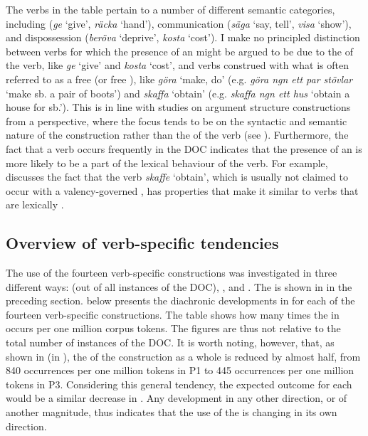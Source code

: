 \documentclass[output=paper]{langscibook}
\begin{document}
The verbs in the table pertain to a number of different semantic categories, including  (\textit{ge} ‘give’, \textit{räcka} ‘hand’), communication (\textit{säga} ‘say, tell’, \textit{visa} ‘show’), and dispossession (\textit{beröva} ‘deprive’, \textit{kosta} ‘cost’). I make no principled distinction between verbs for which the presence of an  might be argued to be due to the  of the verb, like \textit{ge} ‘give’ and \textit{kosta} ‘cost’, and verbs construed with what is often referred to as a free  (or free ), like \textit{göra} ‘make, do’ (e.g. \textit{göra ngn ett par stövlar} ‘make sb. a pair of boots’) and \textit{skaffa} ‘obtain’ (e.g. \textit{skaffa ngn ett hus} ‘obtain a house for sb.’). This is in line with studies on argument structure constructions from a  perspective, where the focus tends to be on the syntactic and semantic nature of the construction rather than the  of the verb (see \citealt{Goldberg1995}). Furthermore, the fact that a verb occurs frequently in the DOC indicates that the presence of an  is more likely to be a part of the lexical behaviour of the verb. For example, \citet[150--151]{Nielsen2019} discusses the fact that the  verb \textit{skaffe} ‘obtain’, which is usually not claimed to occur with a valency-governed , has properties that make it similar to verbs that are lexically .


\subsection{Overview of verb-specific tendencies}\label{sec:valdeson:5.2}


The use of the fourteen verb-specific constructions was investigated in three different ways:  (out of all instances of the DOC), , and . The  is shown in  in the preceding section.  below presents the diachronic developments in  for each of the fourteen verb-specific constructions. The table shows how many times the  in  occurs per one million corpus tokens. The figures are thus not relative to the total number of instances of the DOC. It is worth noting, however, that, as shown in  (in ), the  of the construction as a whole is reduced by almost half, from 840 occurrences per one million tokens in P1 to 445 occurrences per one million tokens in P3. Considering this general tendency, the expected outcome for each  would be a similar decrease in . Any development in any other direction, or of another magnitude, thus indicates that the use of the  is changing in its own direction.
\end{document}

